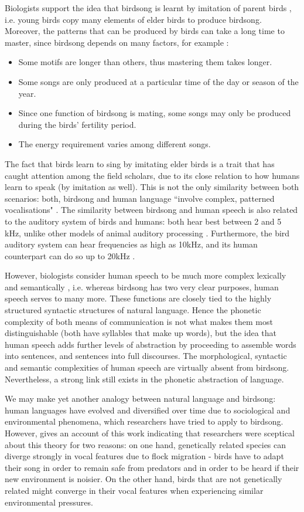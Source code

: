\documentclass[../main.tex]{subfiles} \label{chapter_soa}
\begin{document}
\par Biologists support the idea that birdsong is learnt by imitation of parent birds \cite{Berwick2013}, i.e. young birds copy many elements of elder birds to produce birdsong. Moreover, the patterns that can be produced by birds can take a long time to master, since birdsong depends on many factors, for example \cite{Naguib2014}: 
\begin{itemize}
\item Some motifs are longer than others, thus mastering them takes longer.
\item Some songs are only produced at a particular time of the day or season of the year.
\item Since one function of birdsong is mating, some songs may only be produced during the birds' fertility period.
\item The energy requirement varies among different songs.
\end{itemize}
\par The fact that birds learn to sing by imitating elder birds is a trait that has caught attention among the field scholars, due to its close relation to how humans learn to speak (by imitation as well). This is not the only similarity between both scenarios: both, birdsong and human language ``involve complex, patterned vocalisations" \cite{Berwick2013,Naguib2014}. The similarity between birdsong and human speech is also related to the auditory system of birds and humans: both hear best between 2 and 5 kHz, unlike other models of animal auditory processing \cite{Snowdon2013}. Furthermore, the bird auditory system can hear frequencies as high as 10kHz, and its human counterpart can do so up to 20kHz \cite{Snowdon2013}.
\par However, biologists consider human speech to be much more complex lexically and semantically \cite{Berwick2013}, i.e. whereas birdsong has two very clear purposes, human speech serves to many more. These functions are closely tied to the highly structured syntactic structures of natural language. Hence the phonetic complexity of both means of communication is not what makes them most distinguishable (both have syllables that make up words), but the idea that human speech adds further levels of abstraction by proceeding to assemble words into sentences, and sentences into full discourses. The morphological, syntactic and semantic complexities of human speech are virtually absent from birdsong. Nevertheless, a strong link still exists in the phonetic abstraction of language.
\par We may make yet another analogy between natural language and birdsong: human languages have evolved and diversified over time due to sociological and environmental phenomena, which researchers have tried to apply to birdsong. However, \cite{Cate2004} gives an account of this work indicating that researchers were sceptical about this theory for two reasons: on one hand, genetically related species can diverge strongly in vocal features due to flock migration - birds have to adapt their song in order to remain safe from predators and in order to be heard if their new environment is noisier. On the other hand, birds that are not genetically related might converge in their vocal features when experiencing similar environmental pressures.
\end{document}
